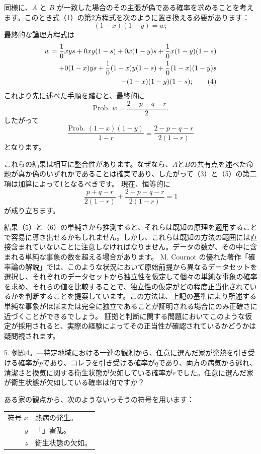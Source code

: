 \documentclass[a4paper,11pt,openany]{ltjsbook}
\begin{document}
同様に、$A$ と $B$ が一致した場合のその主張が偽である確率を求めることを考えます。このとき式（1）の第2方程式を次のように置き換える必要があります：
\[
  (1-x)(1-y) = w;
\]
最終的な論理方程式は
\begin{gather*}
  w = \frac{1}{0}xys + 0xy(1-s) + 0x(1-y)s + \frac{1}{0}x(1-y)(1-s)\\
\hfill + 0(1-x)ys + \frac{1}{0}(1-x)y(1-s) + \frac{1}{0}(1-x)(1-y)s \\
\hfill + (1-x)(1-y)(1-s);   \tag{4}
\end{gather*}
これより先に述べた手順を踏むと、最終的に
\[
  \text{Prob. }w = \frac{2 - p - q - r}{2}.   \tag{5}
\]
したがって
\[
\frac{\text{Prob. } (1-x)(1-y)}{1-r} = \frac{2-p-q-r}{2(1-r)} \tag{6}
\]
となります。

これらの結果は相互に整合性があります。なぜなら、$A$と$B$の共有点を述べた命題が真か偽のいずれかであることは確実であり、したがって（3）と（5）の第二項は加算によって1となるべきです。
現在、恒等的に
\[
\frac{p+q-r}{2(1-r)} + \frac{2-p-q-r}{2(1-r)} = 1
\]
が成り立ちます。

結果（5）と（6）の単純さから推測すると、それらは既知の原理を適用することで容易に導き出せるかもしれません。しかし、これらは既知の方法の範囲には直接含まれていないことに注意しなければなりません。データの数が、その中に含まれる単純な事象の数を超える場合があります。
M. Cournot の優れた著作「確率論の解説」では、このような状況において原始前提から異なるデータセットを選択し、それぞれのデータセットから独立性を仮定して個々の単純な事象の確率を求め、それらの値を比較することで、独立性の仮定がどの程度正当化されているかを判断することを提案しています。この方法は、上記の基準により所述する単純な事象がほぼまたは完全に独立であることが証明される場合にのみ正確さに近づくことができるでしょう。
証拠と判断に関する問題においてこのような仮定が採用されると、実際の経験によってその正当性が確認されているかどうかは疑問視されます。

5. 例題4。---特定地域における一連の観測から、任意に選んだ家が発熱を引き受ける確率が$p$であり、コレラを引き受ける確率が$q$であり、両方の病気から逃れ、清潔さと換気に関する衛生状態が欠如している確率が$r$でした。任意に選んだ家が衛生状態が欠如している確率は何ですか？

ある家の観点から、次のようないっそうの符号を用います：

\begin{tabular}{rl}
  符号 $x$ & 熱病の発生。\\
             $y$ & \hfill「」\hfill 霍乱。 \\
             $z$ & 衛生状態の欠如。
\end{tabular}
\end{document}
